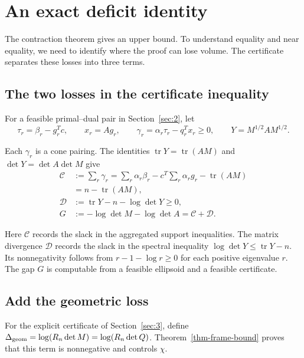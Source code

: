 \section{An exact deficit identity}\label{sec:4}

The contraction theorem gives an upper bound. To understand equality and near equality, we need to identify where the proof can lose volume. The certificate separates these losses into three terms.

\subsection{The two losses in the certificate inequality}\label{sec:4.1}

For a feasible primal--dual pair in Section~\ref{sec:2}, let
\begin{equation}\label{eq:4.1}
\tau_r=\beta_r-g_r^Tc,\qquad x_r=Ag_r,\qquad
\gamma_r=\alpha_r\tau_r-q_r^Tx_r\ge0,
\qquad Y=M^{1/2}AM^{1/2}.
\end{equation}

Each $\gamma_r$ is a cone pairing. The identities
$\operatorname{tr}Y=\operatorname{tr}(AM)$ and
$\det Y=\det A\det M$ give
\begin{equation}\label{eq:4.2}
\begin{aligned}
\mathcal C&:=\sum_r\gamma_r
=\sum_r\alpha_r\beta_r-c^T\sum_r\alpha_rg_r-\operatorname{tr}(AM)\\
&=n-\operatorname{tr}(AM),\\
\mathcal D&:=\operatorname{tr}Y-n-\log\det Y\ge0,\\
G&:=-\log\det M-\log\det A=\mathcal C+\mathcal D.
\end{aligned}
\end{equation}

Here $\mathcal C$ records the slack in the aggregated support inequalities. The matrix divergence $\mathcal D$ records the slack in the spectral inequality $\log\det Y\le\operatorname{tr}Y-n$. Its nonnegativity follows from $r-1-\log r\ge0$ for each positive eigenvalue $r$. The gap $G$ is computable from a feasible ellipsoid and a feasible certificate.

\subsection{Add the geometric loss}\label{sec:4.2}

For the explicit certificate of Section~\ref{sec:3}, define
$\Delta_{\rm geom}=\log(R_n\det M)=\log(R_n\det Q)$. Theorem~\ref{thm-frame-bound} proves that this term is nonnegative and controls $\chi$.


